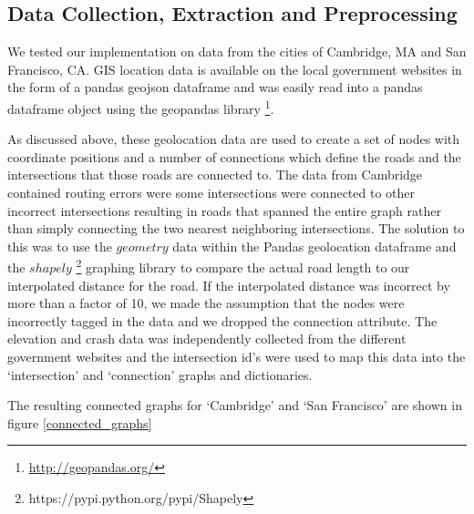 \documentclass[11pt]{article}
\begin{document}
\subsection{Data Collection, Extraction and Preprocessing}
We tested our implementation on data from the cities of Cambridge, MA and San Francisco, CA. GIS location data is available on the local government websites in the form of a pandas geojson dataframe and was easily read into a pandas dataframe object using the geopandas library \footnote{\url{http://geopandas.org/}}.
\par
As discussed above, these geolocation data are used to create a set of nodes with coordinate positions and a number of connections which define the roads and the intersections that those roads are connected to. The data from Cambridge contained routing errors were some intersections were connected to other incorrect intersections resulting in roads that spanned the entire graph rather than simply connecting the two nearest neighboring intersections. The solution to this was to use the $geometry$ data within the Pandas geolocation dataframe and the $shapely$ \footnote{https://pypi.python.org/pypi/Shapely} graphing library to compare the actual road length to our interpolated distance for the road. If the interpolated distance was incorrect by more than a factor of 10, we made the assumption that the nodes were incorrectly tagged in the data and we dropped the connection attribute. The elevation and crash data was independently collected from the different government websites and the intersection id's were used to map this data into the `intersection' and `connection' graphs and dictionaries.
\par The resulting connected graphs for `Cambridge' and `San Francisco' are shown in figure \ref{connected_graphs}
\end{document}
